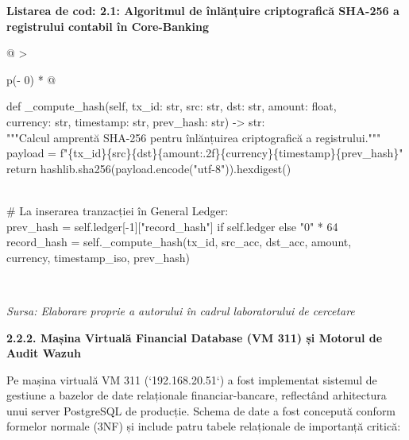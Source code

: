 \documentclass[
]{article}
\begin{document}
\textbf{Listarea de cod: 2.1: Algoritmul de înlănțuire criptografică
SHA-256 a registrului contabil în Core-Banking}

\begin{longtable}[]{@{}
  >{\raggedright\arraybackslash}p{(\columnwidth - 0\tabcolsep) * }@{}}
\toprule\noalign{}
\begin{minipage}[b]{\linewidth}\raggedright
def \_compute\_hash(self, tx\_id: str, src: str, dst: str, amount:
float,\\
currency: str, timestamp: str, prev\_hash: str) -\textgreater{} str:\\
"""Calcul amprentă SHA-256 pentru înlănțuirea criptografică a
registrului."""\\
payload =
f"\{tx\_id\}\textbar\{src\}\textbar\{dst\}\textbar\{amount:.2f\}\textbar\{currency\}\textbar\{timestamp\}\textbar\{prev\_hash\}"\\
return hashlib.sha256(payload.encode("utf-8")).hexdigest()\\
\strut \\
\# La inserarea tranzacției în General Ledger:\\
prev\_hash = self.ledger{[}-1{]}{[}"record\_hash"{]} if self.ledger else
"0" * 64\\
record\_hash = self.\_compute\_hash(tx\_id, src\_acc, dst\_acc,
amount,\\
currency, timestamp\_iso, prev\_hash)\strut
\end{minipage} \\
\midrule\noalign{}
\endhead
\bottomrule\noalign{}
\endlastfoot
\end{longtable}

\emph{Sursa: Elaborare proprie a autorului în cadrul laboratorului de
cercetare}

\textbf{2.2.2. Mașina Virtuală Financial Database (VM 311) și Motorul de
Audit Wazuh}

Pe mașina virtuală VM 311 (`192.168.20.51`) a fost implementat sistemul
de gestiune a bazelor de date relaționale financiar-bancare, reflectând
arhitectura unui server PostgreSQL de producție. Schema de date a fost
concepută conform formelor normale (3NF) și include patru tabele
relaționale de importanță critică:
\end{document}
